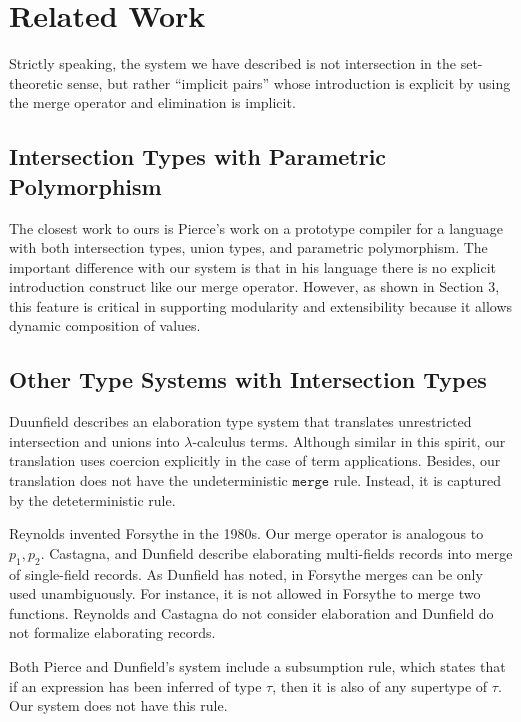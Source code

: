 \section{Related Work}

Strictly speaking, the system we have described is not intersection in the
set-theoretic sense, but rather ``implicit pairs'' whose introduction is
explicit by using the merge operator and elimination is implicit.

\subsection{Intersection Types with Parametric Polymorphism}

The closest work to ours is Pierce's work on a prototype compiler for a language
with both intersection types, union types, and parametric polymorphism. The
important difference with our system is that in his language there is no
explicit introduction construct like our merge operator. However, as shown in
Section 3, this feature is critical in supporting modularity and extensibility
because it allows dynamic composition of values.

\subsection{Other Type Systems with Intersection Types}

Duunfield describes an elaboration type system that translates unrestricted
intersection and unions into $\lambda$-calculus terms. Although similar in this
spirit, our translation uses coercion explicitly in the case of term
applications. Besides, our translation does not have the undeterministic
$ \texttt{merge} $ rule. Instead, it is captured by the deteterministic
 rule.

Reynolds invented Forsythe in the 1980s. Our merge operator is analogous to
$ p_1, p_2 $. Castagna, and Dunfield describe elaborating multi-fields records
into merge of single-field records. As Dunfield has noted, in Forsythe merges
can be only used unambiguously. For instance, it is not allowed in Forsythe to
merge two functions. Reynolds and Castagna do not consider elaboration and
Dunfield do not formalize elaborating records.

Both Pierce and Dunfield's system include a subsumption rule, which states that
if an expression has been inferred of type $ \tau $, then it is also of any
supertype of $ \tau $. Our system does not have this rule.

